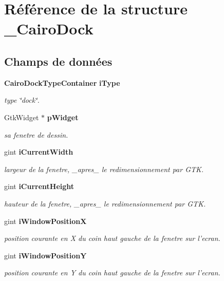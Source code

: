 \section{Référence de la structure \_\-CairoDock}
\label{struct__CairoDock}
\subsection*{Champs de données}
\begin{CompactItemize}
\item 
{\bf CairoDockTypeContainer} {\bf iType}
\begin{CompactList}\small\item\em type \char`\"{}dock\char`\"{}. \item\end{CompactList}\item 
GtkWidget $\ast$ {\bf pWidget}
\begin{CompactList}\small\item\em sa fenetre de dessin. \item\end{CompactList}\item 
gint {\bf iCurrentWidth}
\begin{CompactList}\small\item\em largeur de la fenetre, \_\-apres\_\- le redimensionnement par GTK. \item\end{CompactList}\item 
gint {\bf iCurrentHeight}
\begin{CompactList}\small\item\em hauteur de la fenetre, \_\-apres\_\- le redimensionnement par GTK. \item\end{CompactList}\item 
gint {\bf iWindowPositionX}
\begin{CompactList}\small\item\em position courante en X du coin haut gauche de la fenetre sur l'ecran. \item\end{CompactList}\item 
gint {\bf iWindowPositionY}
\begin{CompactList}\small\item\em position courante en Y du coin haut gauche de la fenetre sur l'ecran. \item\end{CompactList}\item 

\end{CompactItemize}
